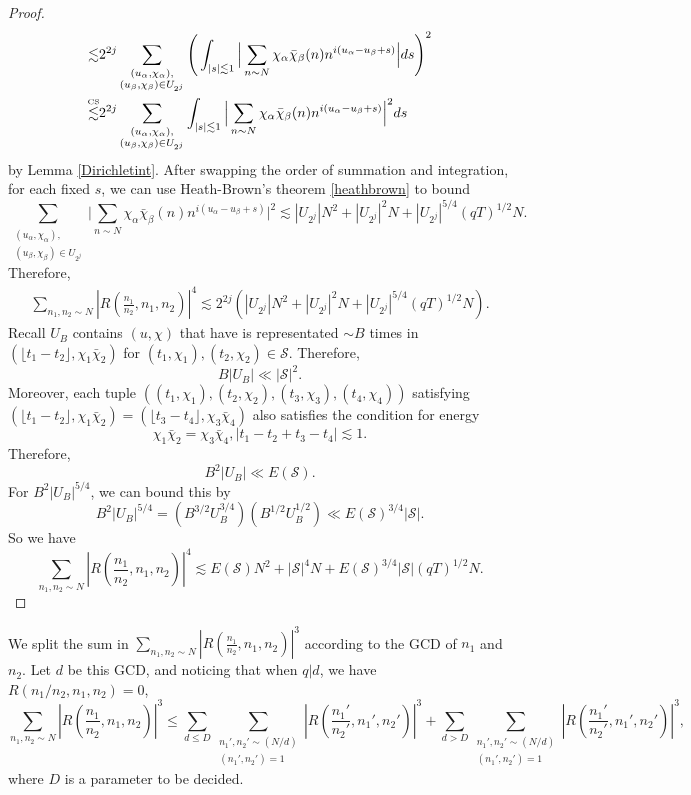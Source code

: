 \begin{proof}
\begin{align*}
 \lesssim & 2^{2j} \sum_{\substack{(u_{\alpha},\chi_{\alpha}),\\(u_{\beta},\chi_{\beta})\in U_{2^j}}} \Bigg(\int_{|s|\lesssim 1}\Big|\sum_{n\sim N}  \chi_\alpha\bar\chi_\beta(n){n}^{i(u_\alpha - u_\beta + s)}\Big|ds \Bigg)^2\\
 \stackon{CS}{\lesssim}& 2^{2j} \sum_{\substack{(u_{\alpha},\chi_{\alpha}),\\(u_{\beta},\chi_{\beta})\in U_{2^j}}} \int_{|s|\lesssim 1}\Big|\sum_{n\sim N}  \chi_\alpha\bar\chi_\beta(n){n}^{i(u_\alpha - u_\beta + s)}\Big|^2ds
\end{align*}
by Lemma \ref{Dirichletint}.
After swapping the order of summation and integration, for each fixed $s$, we can use Heath-Brown's theorem \ref{heathbrown} to bound \[
    \sum_{\substack{(u_{\alpha},\chi_{\alpha}),\\(u_{\beta},\chi_{\beta})\in U_{2^j}}}\Big|\sum_{n\sim N}  \chi_\alpha\bar\chi_\beta(n){n}^{i(u_\alpha - u_\beta + s)}\Big|^2
    \lesssim |U_{2^j}|N^2+ |U_{2^j}|^2N + |U_{2^j}|^{5/4}(qT)^{1/2}N.
\] 
Therefore, \begin{align*}
    \sum_{n_1,n_2\sim N} \left|R\left(\frac{n_1}{n_2} ,n_1,n_2\right) \right|^4 \lesssim 2^{2j}(|U_{2^j}|N^2+ |U_{2^j}|^2N + |U_{2^j}|^{5/4}(qT)^{1/2}N).
\end{align*}
Recall $U_B$ contains $(u,\chi)$ that have is representated $\sim B$ times in $(\lfloor t_1-t_2\rfloor, \chi_1\bar\chi_2)$ for $(t_1,\chi_1),(t_2,\chi_2)\in \mathcal{S}$.
Therefore, \[
B|U_B|\ll |\mathcal{S}|^2.
\] 
Moreover, each tuple $((t_1,\chi_1),(t_2,\chi_2),(t_3,\chi_3),(t_4,\chi_4))$ satisfying $(\lfloor t_1-t_2\rfloor, \chi_1\bar\chi_2)=(\lfloor t_3-t_4\rfloor, \chi_3\bar\chi_4)$ also satisfies the condition for energy \[
    \chi_1\bar\chi_2=\chi_3\bar\chi_4, |t_1-t_2+t_3-t_4|\lesssim 1.
\]
Therefore, \[
    B^2|U_B|\ll E(\mathcal{S}).
\]
For $B^2|U_B|^{5/4}$, we can bound this by \[
B^2|U_B|^{5/4} = (B^{3/2}U_B^{3/4})(B^{1/2}U_B^{1/2})\ll E(\mathcal{S})^{3/4}|\mathcal{S}|.
\]
So we have \[
    \sum_{n_1,n_2\sim N} \left|R\left(\frac{n_1}{n_2} ,n_1,n_2\right) \right|^4 \lesssim E(\mathcal{S})N^2+ |\mathcal{S}|^4N +  E(\mathcal{S})^{3/4}|\mathcal{S}|(qT)^{1/2}N.
\]

\end{proof}


We split the sum in $\sum_{n_1,n_2\sim N}  \left|R\left(\frac{n_1}{n_2} ,n_1,n_2\right) \right|^3$ according to the GCD of $n_1$ and $n_2$. Let $d$ be this GCD, and noticing that when $q|d$,  we have $R\left(n_1/n_2 ,n_1,n_2\right)=0$,\[
    \sum_{n_1,n_2\sim N}  \left|R\left(\frac{n_1}{n_2} ,n_1,n_2\right) \right|^3\leq \sum_{d\leq D}\sum_{\substack{n_1',n_2'\sim (N/d)\\(n_1',n_2')=1}}  \left|R\left(\frac{n_1'}{n_2'} ,n_1',n_2'\right) \right|^3+\sum_{d> D}\sum_{\substack{n_1',n_2'\sim (N/d)\\(n_1',n_2')=1}}  \left|R\left(\frac{n_1'}{n_2'} ,n_1',n_2'\right) \right|^3,
\]
where $D$ is a parameter to be decided.

